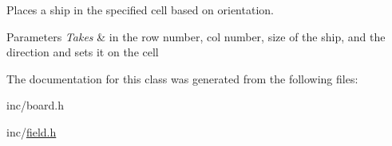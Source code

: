Places a ship in the specified cell based on orientation. 


\begin{DoxyParams}{Parameters}
{\em Takes} & in the row number, col number, size of the ship, and the direction and sets it on the cell \\
\hline
\end{DoxyParams}


The documentation for this class was generated from the following files\+:\begin{DoxyCompactItemize}
\item 
inc/board.\+h\item 
inc/\mbox{\hyperlink{field_8h}{field.\+h}}\end{DoxyCompactItemize}
